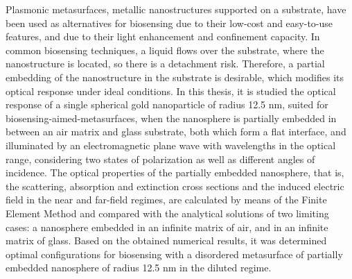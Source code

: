 

\begin{abstracts}        %

\small
Plasmonic metasurfaces, metallic nanostructures supported on a substrate, have been used as alternatives for biosensing due to their low-cost and easy-to-use features, and due to their light enhancement and confinement capacity. In common biosensing techniques, a liquid flows over the substrate, where the nanostructure is located, so there is a  detachment risk. Therefore, a partial embedding of the nanostructure in the substrate is desirable, which modifies its optical response under ideal conditions. In this thesis, it is studied the optical response of a single spherical gold nanoparticle of radius 12.5 nm, suited for biosensing-aimed-metasurfaces, when the nanosphere is partially embedded in between an air matrix and glass substrate, both which form a flat interface, and illuminated by an electromagnetic plane wave with wavelengths in the optical range, considering two states of polarization as well as different angles of incidence. The optical properties of the partially embedded nanosphere, that is, the scattering, absorption and extinction cross sections and the induced electric field in the near and far-field regimes, are calculated by means of the Finite Element Method and compared with the analytical solutions of two limiting cases: a nanosphere embedded in an infinite matrix of air, and in an infinite matrix of glass. Based on the obtained numerical results, it was determined optimal configurations for  biosensing with a disordered metasurface of partially embedded nanosphere of radius 12.5 nm in the diluted regime.\\[2em]


\end{abstracts}

